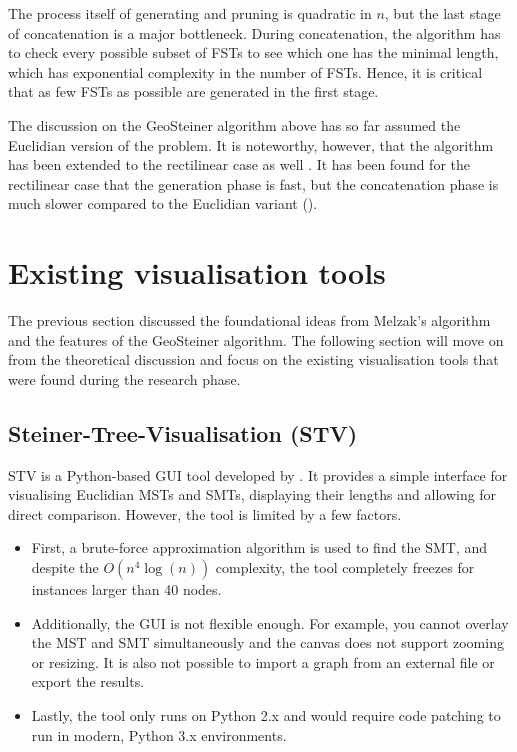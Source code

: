 \documentclass{l4proj}
\begin{document}
The process itself of generating and pruning is quadratic in $n$, but the last stage of concatenation is a major bottleneck. During concatenation, the algorithm has to check every possible subset of FSTs to see which one has the minimal length, which has exponential complexity in the number of FSTs. Hence, it is critical that as few FSTs as possible are generated in the first stage.

The discussion on the GeoSteiner algorithm above has so far assumed the Euclidian version of the problem. It is noteworthy, however, that the algorithm has been extended to the rectilinear case as well \citep{rectilinear_geosteiner}. It has been found for the rectilinear case that the generation phase is fast, but the concatenation phase is much slower compared to the Euclidian variant (\citep{29ee725d11ac4584b72f7fe66c4326fa}).


\section{Existing visualisation tools}
\label{sec:existing_tools}
The previous section discussed the foundational ideas from Melzak's algorithm and the features of the GeoSteiner algorithm. The following section will move on from the theoretical discussion and focus on the existing visualisation tools that were found during the research phase.

\subsection{Steiner-Tree-Visualisation (STV)}
STV is a Python-based GUI tool developed by \cite{Steiner-Tree-Visualisation}. It provides a simple interface for visualising Euclidian MSTs and SMTs, displaying their lengths and allowing for direct comparison. However, the tool is limited by a few factors.
\begin{itemize}
    \item First, a brute-force approximation algorithm is used to find the SMT, and despite the ${O(n^4 \log(n))}$ complexity, the tool completely freezes for instances larger than 40 nodes.
    \item Additionally, the GUI is not flexible enough. For example, you cannot overlay the MST and SMT simultaneously and the canvas does not support zooming or resizing. It is also not possible to import a graph from an external file or export the results.
    \item Lastly, the tool only runs on Python 2.x and would require code patching to run in modern, Python 3.x environments.
\end{itemize}
\end{document}
